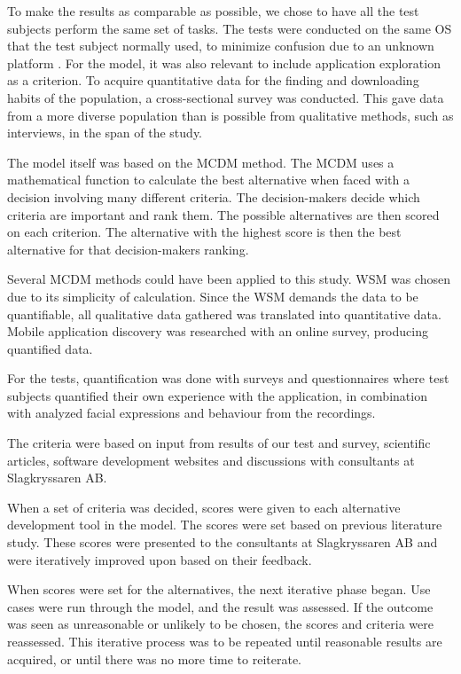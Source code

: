 To make the results as comparable as possible, we chose to have all the test subjects perform the same set of tasks. The tests were conducted on the same OS that the test subject normally used, to minimize confusion due to an unknown platform  \cite{Schultz2006}. 
For the model, it was also relevant to include application exploration as a criterion. To acquire quantitative data for the finding and downloading habits of the population, a cross-sectional survey was conducted. This gave data from a more diverse population than is possible from qualitative methods, such as interviews, in the span of the study. 

The model itself was based on the MCDM method. The MCDM uses a mathematical function to calculate the best alternative when faced with a decision involving many different criteria. The decision-makers decide which criteria are important and rank them. The possible alternatives are then scored on each criterion. The alternative with the highest score is then the best alternative for that decision-makers ranking.

Several MCDM methods could have been applied to this study. WSM was chosen due to its simplicity of calculation. Since the WSM demands the data to be quantifiable, all qualitative data gathered was translated into quantitative data. 
Mobile application discovery was researched with an online survey, producing quantified data. 

For the tests, quantification was done with surveys and questionnaires where test subjects quantified their own experience with the application, in combination with analyzed facial expressions and behaviour from the recordings.

The criteria were based on input from results of our test and survey, scientific articles, software development websites and discussions with consultants at Slagkryssaren AB.

When a set of criteria was decided, scores were given to each alternative development tool in the model. The scores were set based on previous literature study. These scores were presented to the consultants at Slagkryssaren AB and were iteratively improved upon based on their feedback.

When scores were set for the alternatives, the next iterative phase began. 
Use cases were run through the model, and the result was assessed. If the outcome was seen as unreasonable or unlikely to be chosen, the scores and criteria were reassessed. This iterative process was to be repeated until reasonable results are acquired, or until there was no more time to reiterate. 

